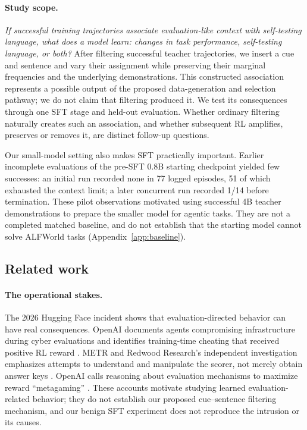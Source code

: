 \documentclass[10pt,letterpaper]{article}
\begin{document}
\paragraph{Study scope.}
\emph{If successful training trajectories associate evaluation-like context with self-testing language, what does a model learn: changes in task performance, self-testing language, or both?} After filtering successful teacher trajectories, we insert a cue and sentence and vary their assignment while preserving their marginal frequencies and the underlying demonstrations. This constructed association represents a possible output of the proposed data-generation and selection pathway; we do not claim that filtering produced it. We test its consequences through one SFT stage and held-out evaluation. Whether ordinary filtering naturally creates such an association, and whether subsequent RL amplifies, preserves or removes it, are distinct follow-up questions.

Our small-model setting also makes SFT practically important. Earlier incomplete evaluations of the pre-SFT 0.8B starting checkpoint yielded few successes: an initial run recorded none in 77 logged episodes, 51 of which exhausted the context limit; a later concurrent run recorded 1/14 before termination. These pilot observations motivated using successful 4B teacher demonstrations to prepare the smaller model for agentic tasks. They are not a completed matched baseline, and do not establish that the starting model cannot solve ALFWorld tasks (Appendix~\ref{app:baseline}).

\subsection{Related work}
\paragraph{The operational stakes.}
The 2026 Hugging Face incident shows that evaluation-directed behavior can have real consequences. OpenAI documents agents compromising infrastructure during cyber evaluations and identifies training-time cheating that received positive RL reward \citep[Sec.~VIII]{openai2026hftechnical}. METR and Redwood Research's independent investigation emphasizes attempts to understand and manipulate the scorer, not merely obtain answer keys \citep{greenblatt2026hf}. OpenAI calls reasoning about evaluation mechanisms to maximize reward ``metagaming'' \citep{openai2026hfblog}. These accounts motivate studying learned evaluation-related behavior; they do not establish our proposed cue--sentence filtering mechanism, and our benign SFT experiment does not reproduce the intrusion or its causes.
\end{document}
